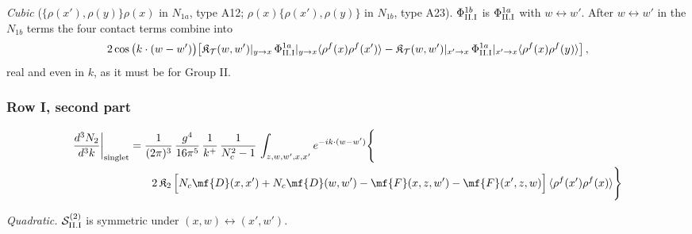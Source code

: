 \emph{Cubic} ($\{\rho(x'),\rho(y)\}\rho(x)$ in $N_{1a}$, type A12; $\rho(x)\{\rho(x'),\rho(y)\}$ in $N_{1b}$, type A23). $\Phi^{1b}_{\rm II.I}$ is $\Phi^{1a}_{\rm II.I}$ with $w\leftrightarrow w'$. After $w\leftrightarrow w'$ in the $N_{1b}$ terms the four contact terms combine into
\begin{align}
2\cos\big(k\cdot(w-w')\big)\big[\mathfrak{K}_{\mathcal{T}}(w,w')|_{y\to x}\,\Phi^{1a}_{\rm II.I}|_{y\to x}\langle\rho^{f}(x)\rho^{f}(x')\rangle-\mathfrak{K}_{\mathcal{T}}(w,w')|_{x'\to x}\,\Phi^{1a}_{\rm II.I}|_{x'\to x}\langle\rho^{f}(x)\rho^{f}(y)\rangle\big]\,,\notag
\end{align}
real and even in $k$, as it must be for Group II.
\subsubsection*{Row I, second part}

\begin{align}
\frac{d^{3}N_{2}}{d^{3}k}\bigg|_{\rm singlet}&=\frac{1}{(2\pi)^{3}}\,\frac{g^{4}}{16\pi^{5}}\,\frac{1}{k^{+}}\,\frac{1}{N_{c}^{2}-1}\,\int_{z,w,w',x,x'}e^{-ik\cdot(w-w')}\Bigg\{\notag\\
&\qquad 2\,\mathfrak{K}_{2}\,\Big[N_{c}\mf{D}(x,x')+N_{c}\mf{D}(w,w')-\mf{F}(x,z,w')-\mf{F}(x',z,w)\Big]\,\langle\rho^{f}(x')\rho^{f}(x)\rangle\Bigg\}\label{eq:s-II-I-2}
\end{align}

\emph{Quadratic.} $\mathcal{S}^{(2)}_{\rm II.I}$ is symmetric under $(x,w)\leftrightarrow(x',w')$.
